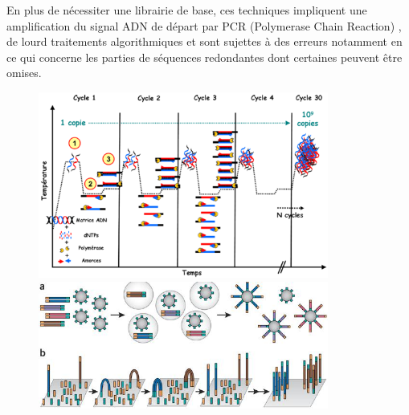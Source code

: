  En plus de nécessiter une librairie de base, ces techniques impliquent une amplification du signal ADN de départ par PCR (Polymerase Chain Reaction) \cite{Saiki1985}, de lourd traitements algorithmiques et sont sujettes à des erreurs notamment en ce qui concerne les parties de séquences redondantes dont certaines peuvent être omises. 


 \begin{figure}[H]
\begin{center}
\includegraphics[width=0.85\textwidth]{pcr.png}

\vspace{0.5cm}

\includegraphics[width=0.85\textwidth]{bridgepcr.jpg}
\vspace{0.5cm}


\end{center}
\end{figure}

